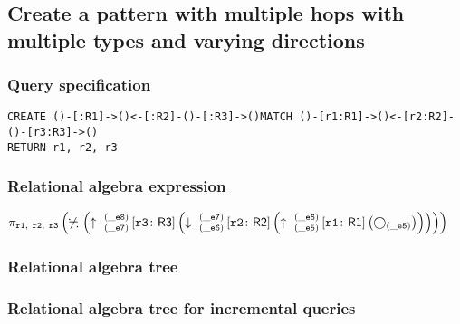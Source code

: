 \subsection{Create a pattern with multiple hops with multiple types and varying directions}

\subsubsection*{Query specification}

\begin{lstlisting}
CREATE ()-[:R1]->()<-[:R2]-()-[:R3]->()MATCH ()-[r1:R1]->()<-[r2:R2]-()-[r3:R3]->()
RETURN r1, r2, r3
\end{lstlisting}

\subsubsection*{Relational algebra expression}

$\projection{\var{r1},~\var{r2},~\var{r3}} \left(\alldifferent{} \left(\expandout{\_e7}{\_e8}{}{r3}{R3} \left(\expandin{\_e6}{\_e7}{}{r2}{R2} \left(\expandout{\_e5}{\_e6}{}{r1}{R1} \left(\getvertices{\_e5}{}\right)\right)\right)\right)\right)$

\subsubsection*{Relational algebra tree}


\subsubsection*{Relational algebra tree for incremental queries}

